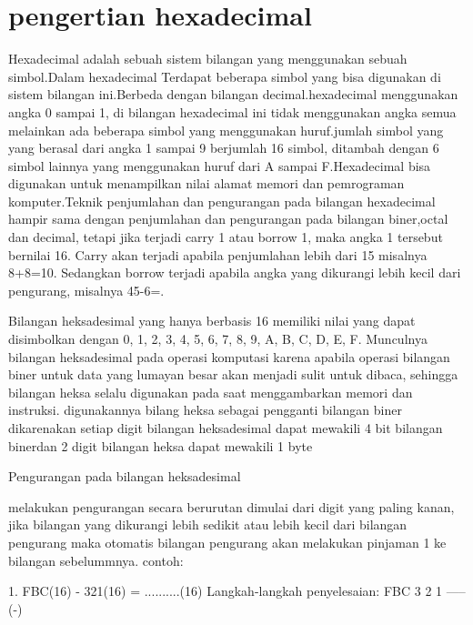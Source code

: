 
\section{pengertian hexadecimal}
	Hexadecimal adalah sebuah sistem bilangan yang menggunakan sebuah simbol.Dalam hexadecimal Terdapat beberapa simbol yang bisa digunakan di sistem bilangan ini.Berbeda dengan bilangan decimal.hexadecimal menggunakan angka 0 sampai 1, di bilangan hexadecimal ini tidak menggunakan angka semua melainkan ada beberapa simbol yang menggunakan huruf.jumlah simbol yang yang berasal dari angka 1 sampai 9 berjumlah 16 simbol, ditambah dengan 6 simbol lainnya yang menggunakan huruf dari A sampai F.Hexadecimal bisa digunakan untuk menampilkan nilai alamat memori dan pemrograman komputer.Teknik penjumlahan dan pengurangan pada bilangan hexadecimal hampir sama dengan penjumlahan dan pengurangan pada bilangan biner,octal dan decimal, tetapi jika terjadi carry 1 atau borrow 1, maka angka 1 tersebut bernilai 16. Carry akan terjadi apabila penjumlahan lebih dari 15 misalnya 8+8=10. Sedangkan borrow terjadi apabila angka yang dikurangi lebih kecil dari pengurang, misalnya 45-6=.
	
	Bilangan heksadesimal yang hanya berbasis 16 memiliki nilai yang dapat disimbolkan dengan 0, 1, 2, 3, 4, 5, 6, 7, 8, 9, A, B, C, D, E, F.
Munculnya bilangan heksadesimal pada operasi komputasi karena apabila operasi bilangan biner untuk data yang lumayan besar akan menjadi 
sulit untuk dibaca, sehingga bilangan heksa selalu digunakan pada saat menggambarkan memori dan instruksi. digunakannya bilang heksa sebagai 
pengganti bilangan biner dikarenakan setiap digit bilangan heksadesimal dapat mewakili 4 bit bilangan binerdan 2 digit bilangan heksa dapat 
mewakili 1 byte 

	Pengurangan pada bilangan heksadesimal

melakukan pengurangan secara berurutan dimulai dari digit yang paling kanan, jika bilangan yang dikurangi lebih sedikit atau lebih kecil 
dari bilangan pengurang maka otomatis bilangan pengurang akan melakukan pinjaman 1 ke bilangan sebelummnya. contoh: 
	
	1. FBC(16) - 321(16) = ..........(16)
 Langkah-langkah penyelesaian: 
FBC 
3 2 1 ----- (-)

